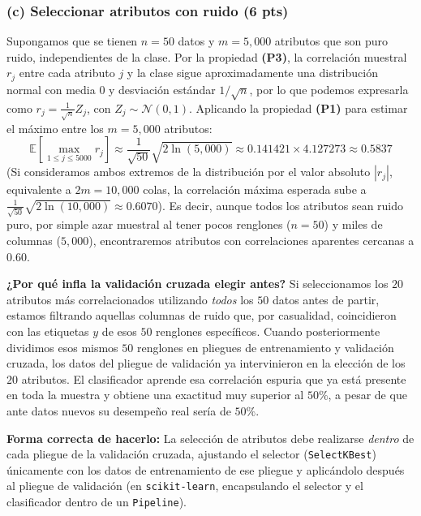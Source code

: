 \documentclass[11pt, letterpaper]{article}
\begin{document}
\subsubsection*{(c) Seleccionar atributos con ruido (6 pts)}

Supongamos que se tienen $n = 50$ datos y $m = 5{,}000$ atributos que son puro ruido, independientes de la clase. Por la propiedad \textbf{(P3)}, la correlación muestral $r_j$ entre cada atributo $j$ y la clase sigue aproximadamente una distribución normal con media $0$ y desviación estándar $1/\sqrt{n}$, por lo que podemos expresarla como $r_j = \frac{1}{\sqrt{n}} Z_j$, con $Z_j \sim \mathcal{N}(0,1)$. Aplicando la propiedad \textbf{(P1)} para estimar el máximo entre los $m = 5{,}000$ atributos:
\[
    \mathbb{E}\left[\max_{1 \le j \le 5000} r_j\right] \approx \frac{1}{\sqrt{50}}\sqrt{2 \ln(5{,}000)} \approx 0.141421 \times 4.127273 \approx 0.5837
\]
(Si consideramos ambos extremos de la distribución por el valor absoluto $|r_j|$, equivalente a $2m = 10{,}000$ colas, la correlación máxima esperada sube a $\frac{1}{\sqrt{50}}\sqrt{2\ln(10{,}000)} \approx 0.6070$). Es decir, aunque todos los atributos sean ruido puro, por simple azar muestral al tener pocos renglones ($n=50$) y miles de columnas ($5{,}000$), encontraremos atributos con correlaciones aparentes cercanas a $0.60$.

\textbf{¿Por qué infla la validación cruzada elegir antes?} Si seleccionamos los $20$ atributos más correlacionados utilizando \emph{todos} los $50$ datos antes de partir, estamos filtrando aquellas columnas de ruido que, por casualidad, coincidieron con las etiquetas $y$ de esos $50$ renglones específicos. Cuando posteriormente dividimos esos mismos $50$ renglones en pliegues de entrenamiento y validación cruzada, los datos del pliegue de validación ya intervinieron en la elección de los $20$ atributos. El clasificador aprende esa correlación espuria que ya está presente en toda la muestra y obtiene una exactitud muy superior al $50\%$, a pesar de que ante datos nuevos su desempeño real sería de $50\%$.

\textbf{Forma correcta de hacerlo:} La selección de atributos debe realizarse \emph{dentro} de cada pliegue de la validación cruzada, ajustando el selector (\texttt{SelectKBest}) únicamente con los datos de entrenamiento de ese pliegue y aplicándolo después al pliegue de validación (en \texttt{scikit-learn}, encapsulando el selector y el clasificador dentro de un \texttt{Pipeline}).
\end{document}
